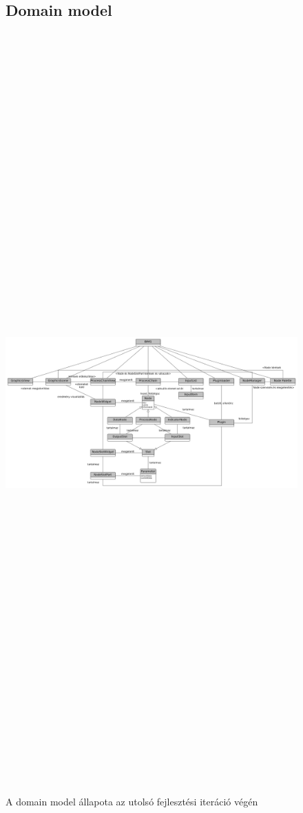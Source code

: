 \documentclass[a4paper,12pt,oneside]{report}
\begin{document}
\begin{landscape}
\begin{figure}[h]
  \subsection{Domain model}
  \includegraphics[width=26cm,height=30cm,keepaspectratio]{domain_gray.png}
  \caption{A domain model állapota az utolsó fejlesztési iteráció végén }

  \label{fig:bimg_domain_img}
\end{figure}
\end{landscape}
\end{document}
